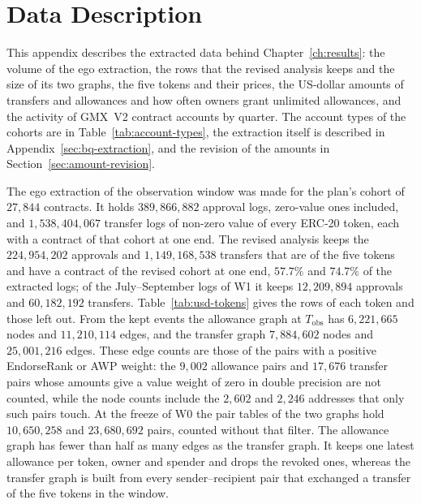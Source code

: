\section{Data Description}
\label{ch:appendix-data}

This appendix describes the extracted data behind Chapter~\ref{ch:results}: the volume of the ego extraction, the rows that the revised analysis keeps and the size of its two graphs, the five tokens and their prices, the US-dollar amounts of transfers and allowances and how often owners grant unlimited allowances, and the activity of GMX~V2 contract accounts by quarter. The account types of the cohorts are in Table~\ref{tab:account-types}, the extraction itself is described in Appendix~\ref{sec:bq-extraction}, and the revision of the amounts in Section~\ref{sec:amount-revision}.


The ego extraction of the observation window was made for the plan's cohort of $27{,}844$ contracts. It holds $389{,}866{,}882$ approval logs, zero-value ones included, and $1{,}538{,}404{,}067$ transfer logs of non-zero value of every ERC-20 token, each with a contract of that cohort at one end. The revised analysis keeps the $224{,}954{,}202$ approvals and $1{,}149{,}168{,}538$ transfers that are of the five tokens and have a contract of the revised cohort at one end, $57.7\%$ and $74.7\%$ of the extracted logs; of the July--September logs of W1 it keeps $12{,}209{,}894$ approvals and $60{,}182{,}192$ transfers. Table~\ref{tab:usd-tokens} gives the rows of each token and those left out. From the kept events the allowance graph at $T_{\text{obs}}$ has $6{,}221{,}665$ nodes and $11{,}210{,}114$ edges, and the transfer graph $7{,}884{,}602$ nodes and $25{,}001{,}216$ edges. These edge counts are those of the pairs with a positive EndorseRank or AWP weight: the $9{,}002$ allowance pairs and $17{,}676$ transfer pairs whose amounts give a value weight of zero in double precision are not counted, while the node counts include the $2{,}602$ and $2{,}246$ addresses that only such pairs touch. At the freeze of W0 the pair tables of the two graphs hold $10{,}650{,}258$ and $23{,}680{,}692$ pairs, counted without that filter. The allowance graph has fewer than half as many edges as the transfer graph. It keeps one latest allowance per token, owner and spender and drops the revoked ones, whereas the transfer graph is built from every sender--recipient pair that exchanged a transfer of the five tokens in the window.

